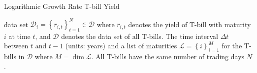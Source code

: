 \documentclass[11pt]{article}
\theoremstyle{definition}
\begin{document}
\begin{algorithm}[h]
    \caption{Logarithmic Growth Rate T-bill Yield}\label{algo-log-return-change-interest-rates}
    \begin{algorithmic}[1]

        \Statex
        \Require data set $\mathcal{D}_{i} = \left\{r_{i,t}\right\}_{t=1}^{N}\in\mathcal{D}$ where $r_{i,t}$ denotes the yield of T-bill with maturity $i$ at time $t$, 
		and $\mathcal{D}$ denotes the data set of all T-bills.
        \Require The time interval $\Delta{t}$ between $t$ and $t-1$ (units: years) and a list of maturities $\mathcal{L} = \left\{i\right\}_{i=1}^{M}$ for the T-bills in $\mathcal{D}$ where $M = \dim\mathcal{L}$.
		\Require All T-bills have the same number of trading days $N$.
     
        \Statex
            \EndFor
        \EndFor
        \Statex
		\EndProcedure
    \end{algorithmic}
\end{algorithm}
\end{document}
